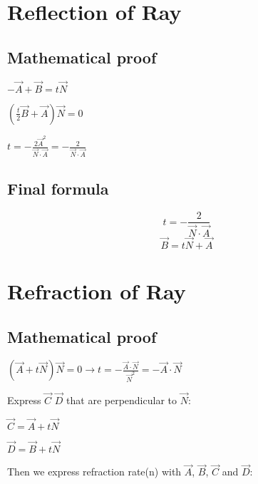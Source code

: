 \documentclass{article}
\begin{document}
\section{Reflection of Ray}
\subsection{Mathematical proof}
$-\vec{A} + \vec{B} = t\vec{N}$

$(\frac{t}{2}\vec{B} + \vec{A})\vec{N} = 0$

$t = -\frac{2\vec{A}^2}{\vec{N} \cdot \vec{A}} = -\frac{2}{\vec{N} \cdot \vec{A}}$

\subsection{Final formula}
\begin{equation}
t = -\frac{2}{\vec{N} \cdot \vec{A}}
\end{equation}
\begin{equation}
\vec{B} = t\vec{N} + \vec{A}
\end{equation}

\section{Refraction of Ray}
\subsection{Mathematical proof}

$
(\vec{A} + t\vec{N})\vec{N} = 0
\rightarrow
t = -\frac{\vec{A} \cdot \vec{N}}{\vec{N}^2}
=
-\vec{A} \cdot \vec{N}
$

Express $\vec{C}$ $\vec{D}$ that are perpendicular to $\vec{N}$:

$\vec{C} = \vec{A} + t\vec{N}$

$\vec{D} = \vec{B} + t\vec{N}$

Then we express refraction rate(n) with $\vec{A}$, $\vec{B}$, $\vec{C}$ and $\vec{D}$:
\end{document}
